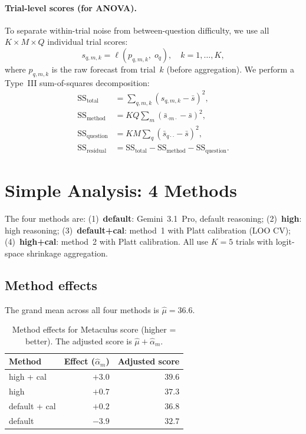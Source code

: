 \documentclass[11pt]{article}
\begin{document}
\paragraph{Trial-level scores (for ANOVA).}
To separate within-trial noise from between-question difficulty,
we use all $K \times M \times Q$ individual trial scores:
\begin{equation}
  s_{q,m,k} = \ell(p_{q,m,k},\; o_q), \quad k = 1, \ldots, K,
\end{equation}
where $p_{q,m,k}$ is the raw forecast from trial~$k$ (before aggregation).
We perform a Type~III sum-of-squares decomposition:
\begin{align}
  \mathrm{SS}_{\mathrm{total}} &= \sum_{q,m,k} (s_{q,m,k} - \bar{s})^2, \\
  \mathrm{SS}_{\mathrm{method}} &= KQ \sum_m (\bar{s}_{\cdot m \cdot} - \bar{s})^2, \\
  \mathrm{SS}_{\mathrm{question}} &= KM \sum_q (\bar{s}_{q \cdot \cdot} - \bar{s})^2, \\
  \mathrm{SS}_{\mathrm{residual}} &= \mathrm{SS}_{\mathrm{total}}
    - \mathrm{SS}_{\mathrm{method}} - \mathrm{SS}_{\mathrm{question}}.
\end{align}


\section{Simple Analysis: 4 Methods}
\label{sec:simple}

The four methods are:
(1)~\textbf{default}: Gemini~3.1~Pro, default reasoning;
(2)~\textbf{high}: high reasoning;
(3)~\textbf{default+cal}: method~1 with Platt calibration (LOO CV);
(4)~\textbf{high+cal}: method~2 with Platt calibration.
All use $K=5$ trials with logit-space shrinkage aggregation.

\subsection{Method effects}

The grand mean across all four methods is $\hat{\mu} = 36.6$.

\begin{table}[h]
\centering
\begin{tabular}{lrr}
\toprule
Method & Effect ($\hat{\alpha}_m$) & Adjusted score \\
\midrule
high + cal & $+3.0$ & $39.6$ \\
high       & $+0.7$ & $37.3$ \\
default + cal & $+0.2$ & $36.8$ \\
default    & $-3.9$ & $32.7$ \\
\bottomrule
\end{tabular}
\caption{Method effects for Metaculus score (higher = better).
  The adjusted score is $\hat{\mu} + \hat{\alpha}_m$.}
\label{tab:simple_effects}
\end{table}
\end{document}
